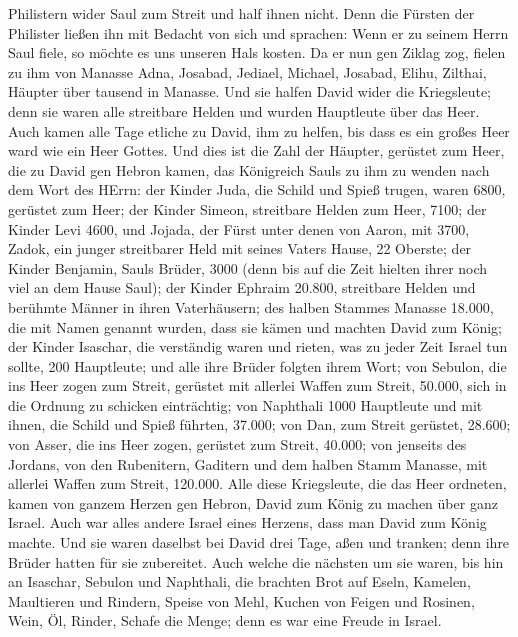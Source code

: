 Philistern wider Saul zum Streit und half ihnen nicht. Denn die Fürsten
der Philister ließen ihn mit Bedacht von sich und sprachen: Wenn er zu
seinem Herrn Saul fiele, so möchte es uns unseren Hals kosten.
 Da er nun gen Ziklag zog, fielen zu ihm von Manasse
Adna, Josabad, Jediael, Michael, Josabad, Elihu, Zilthai, Häupter über
tausend in Manasse.  Und sie halfen David wider die
Kriegsleute; denn sie waren alle streitbare Helden und wurden Hauptleute
über das Heer.  Auch kamen alle Tage etliche zu David,
ihm zu helfen, bis dass es ein großes Heer ward wie ein Heer Gottes.
 Und dies ist die Zahl der Häupter, gerüstet zum Heer,
die zu David gen Hebron kamen, das Königreich Sauls zu ihm zu wenden
nach dem Wort des HErrn:  der Kinder Juda, die Schild und
Spieß trugen, waren 6800, gerüstet zum Heer;  der Kinder
Simeon, streitbare Helden zum Heer, 7100;  der Kinder
Levi 4600,  und Jojada, der Fürst unter denen von Aaron,
mit 3700,  Zadok, ein junger streitbarer Held mit seines
Vaters Hause, 22 Oberste;  der Kinder Benjamin, Sauls
Brüder, 3000 (denn bis auf die Zeit hielten ihrer noch viel an dem Hause
Saul);  der Kinder Ephraim 20.800, streitbare Helden und
berühmte Männer in ihren Vaterhäusern;  des halben
Stammes Manasse 18.000, die mit Namen genannt wurden, dass sie kämen und
machten David zum König;  der Kinder Isaschar, die
verständig waren und rieten, was zu jeder Zeit Israel tun sollte, 200
Hauptleute; und alle ihre Brüder folgten ihrem Wort;  von
Sebulon, die ins Heer zogen zum Streit, gerüstet mit allerlei Waffen zum
Streit, 50.000, sich in die Ordnung zu schicken einträchtig;
 von Naphthali 1000 Hauptleute und mit ihnen, die Schild
und Spieß führten, 37.000;  von Dan, zum Streit gerüstet,
28.600;  von Asser, die ins Heer zogen, gerüstet zum
Streit, 40.000;  von jenseits des Jordans, von den
Rubenitern, Gaditern und dem halben Stamm Manasse, mit allerlei Waffen
zum Streit, 120.000.  Alle diese Kriegsleute, die das
Heer ordneten, kamen von ganzem Herzen gen Hebron, David zum König zu
machen über ganz Israel. Auch war alles andere Israel eines Herzens,
dass man David zum König machte.  Und sie waren daselbst
bei David drei Tage, aßen und tranken; denn ihre Brüder hatten für sie
zubereitet.  Auch welche die nächsten um sie waren, bis
hin an Isaschar, Sebulon und Naphthali, die brachten Brot auf Eseln,
Kamelen, Maultieren und Rindern, Speise von Mehl, Kuchen von Feigen und
Rosinen, Wein, Öl, Rinder, Schafe die Menge; denn es war eine Freude in
Israel.

